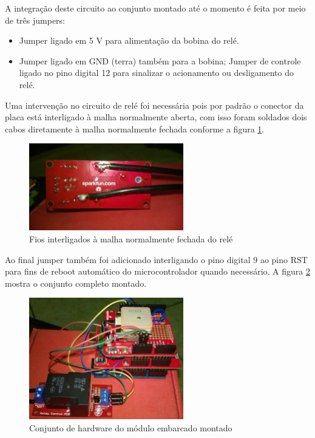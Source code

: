 A integração deste circuito ao conjunto montado até o momento é feita por meio de três jumpers:

\begin{itemize}
	\item Jumper ligado em 5 V para alimentação da bobina do relé.
	\item Jumper ligado em GND (terra) também para a bobina;
  \intem Jumper de controle ligado no pino digital 12 para sinalizar o acionamento ou desligamento do relé.
\end{itemize}

Uma intervenção no circuito de relé foi necessária pois por padrão o conector da placa está interligado à malha normalmente aberta, com isso foram soldados dois cabos diretamente à malha normalmente fechada conforme a figura \ref{fig:fiosrelay}.

\begin{figure}[!htb]
\centering
\includegraphics[width=0.6\textwidth]{figures/jmpNC.jpg}
\caption{Fios interligados à malha normalmente fechada do relé}
\label{fig:fiosrelay}
\end{figure}

Ao final jumper também foi adicionado interligando o pino digital 9 ao pino RST para fins de reboot automático do microcontrolador quando necessário. A figura \ref{fig:modulomontado} mostra o conjunto completo montado.

\begin{figure}[!htb]
\centering
\includegraphics[width=0.6\textwidth]{figures/fullMount.jpg}
\caption{Conjunto de hardware do módulo embarcado montado}
\label{fig:modulomontado}
\end{figure}

